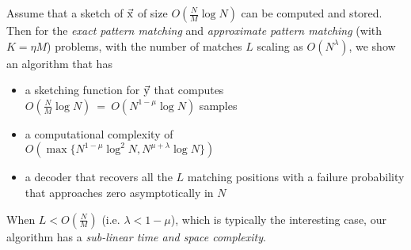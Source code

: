 	Assume that a sketch of $\vec{\mathrm{x}}$ of size $O(\frac{N}{M} \log N)$ can be computed and stored. Then for the {\it exact pattern matching} and {\it approximate pattern matching} (with $K = \eta M$) problems, with the number of matches $L$ scaling as $O(N^{\lambda})$, we show an algorithm that has
	\begin{itemize}
		\item a sketching function for $\vec{\mathrm{y}}$ that computes \\ $O(\frac{N}{M}\log N)~=~ O\left(N^{1-\mu}\log N\right)$ samples
		\item a computational complexity of \\$O\left(\max\{N^{1-\mu}\log^2 N, N^{\mu+\lambda}\log N \}\right)$
		\item a decoder that recovers all the $L$ matching positions with a failure probability that approaches zero asymptotically in $N$		
	\end{itemize} \vspace{-5pt}
	When $L<O\left(\frac{N}{M}\right)$ (i.e. $\lambda<1-\mu$), which is typically the interesting case, our algorithm has a {\it sub-linear time and space complexity}.
	

